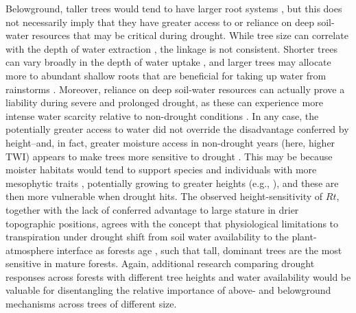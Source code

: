 \documentclass[
]{article}
\begin{document}
Belowground, taller trees would tend to have larger root systems
\citep{enquist_global_2002}, but this does not necessarily imply that
they have greater access to or reliance on deep soil-water resources
that may be critical during drought. While tree size can correlate with
the depth of water extraction \citep{brum_hydrological_2018}, the
linkage is not consistent. Shorter trees can vary broadly in the depth
of water uptake \citep{stahl_depth_2013}, and larger trees may allocate
more to abundant shallow roots that are beneficial for taking up water
from rainstorms \citep{meinzer_partitioning_1999}. Moreover, reliance on
deep soil-water resources can actually prove a liability during severe
and prolonged drought, as these can experience more intense water
scarcity relative to non-drought conditions
\citep{chitra-tarak_roots_2018}. In any case, the potentially greater
access to water did not override the disadvantage conferred by
height--and, in fact, greater moisture access in non-drought years
(here, higher TWI) appears to make trees more sensitive to drought
\citep{zuleta_drought-induced_2017, stovall_tree_2019}. This may be
because moister habitats would tend to support species and individuals
with more mesophytic traits
\citep{bartlett_drought_2016, mencuccini_ecological_2003, medeiros_extensive_2019},
potentially growing to greater heights (e.g.,
\citet{detto_hydrological_2013}), and these are then more vulnerable
when drought hits. The observed height-sensitivity of \(Rt\), together
with the lack of conferred advantage to large stature in drier
topographic positions, agrees with the concept that physiological
limitations to transpiration under drought shift from soil water
availability to the plant-atmosphere interface as forests age
\citep{bretfeld_plant_2018}, such that tall, dominant trees are the most
sensitive in mature forests. Again, additional research comparing
drought responses across forests with different tree heights and water
availability would be valuable for disentangling the relative importance
of above- and belowground mechanisms across trees of different size.
\end{document}
